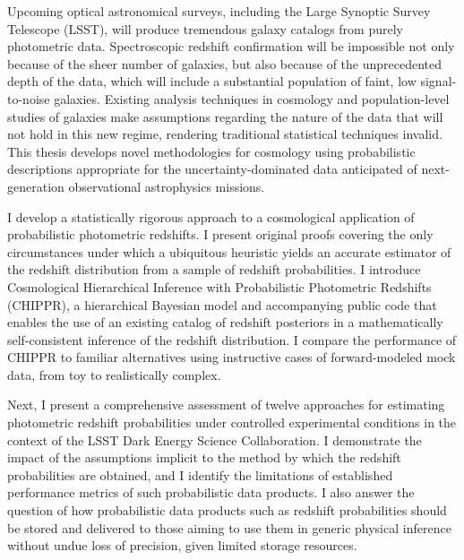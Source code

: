Upcoming optical astronomical surveys, including the Large Synoptic Survey Telescope (LSST), will produce tremendous galaxy catalogs from purely photometric data.
Spectroscopic redshift confirmation will be impossible not only because of the sheer number of galaxies, but also because of the unprecedented depth of the data, which will include a substantial population of faint, low signal-to-noise galaxies.
Existing analysis techniques in cosmology and population-level studies of galaxies make assumptions regarding the nature of the data that will not hold in this new regime, rendering traditional statistical techniques invalid.
This thesis develops novel methodologies for cosmology using probabilistic descriptions appropriate for the uncertainty-dominated data anticipated of next-generation observational astrophysics missions. 

I develop a statistically rigorous approach to a cosmological application of probabilistic photometric redshifts.
I present original proofs covering the only circumstances under which a ubiquitous heuristic yields an accurate estimator of the redshift distribution from a sample of redshift probabilities.
I introduce Cosmological Hierarchical Inference with Probabilistic Photometric Redshifts (CHIPPR), a hierarchical Bayesian model and accompanying public code that enables the use of an existing catalog of redshift posteriors in a mathematically self-consistent inference of the redshift distribution.
I compare the performance of CHIPPR to familiar alternatives using instructive cases of forward-modeled mock data, from toy to realistically complex.

Next, I present a comprehensive assessment of twelve approaches for estimating photometric redshift probabilities under controlled experimental conditions in the context of the LSST Dark Energy Science Collaboration.
I demonstrate the impact of the assumptions implicit to the method by which the redshift probabilities are obtained, and I identify the limitations of established performance metrics of such probabilistic data products.
I also answer the question of how probabilistic data products such as redshift probabilities should be stored and delivered to those aiming to use them in generic physical inference without undue loss of precision, given limited storage resources.

